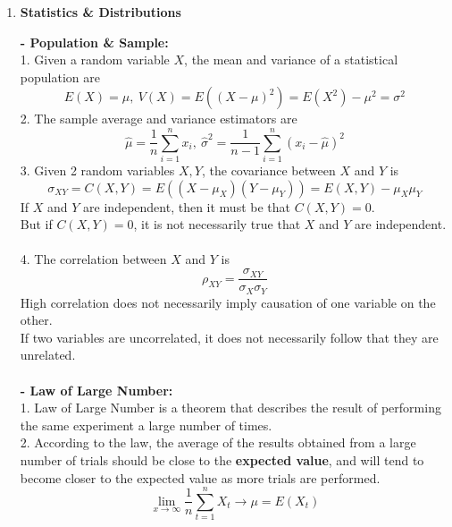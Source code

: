\documentclass{article}
\begin{document}
\begin{enumerate}[S1 - ]
    \item \textbf{Statistics \& Distributions} \\\par
    \textbf{- Population \& Sample:}\\
    1. Given a random variable $X$, the mean and variance of a statistical population are
    \begin{equation*}
    E(X) = \mu, \ V(X) = E((X-\mu)^{2}) = E(X^2)-\mu^2= \sigma^{2}
    \end{equation*}
    2. The sample average and variance estimators are
    \begin{equation*}
    \hat{\mu} = \frac{1}{n} \sum_{i=1}^{n} x_i, \ \hat{\sigma}^2 = \frac{1}{n-1} \sum_{i=1}^{n} (x_i-\hat{\mu})^2
    \end{equation*}
    3. Given 2 random variables $X,Y$, the covariance between $X$ and $Y$ is
    \begin{equation*}
    \sigma_{XY} = C(X,Y) = E((X-\mu_X)(Y-\mu_Y)) = E(X,Y) - \mu_X\mu_Y
    \end{equation*}
    If $X$ and $Y$ are independent, then it must be that $C(X,Y) = 0$.\\
    But if $C(X,Y) = 0$, it is not necessarily true that $X$ and $Y$ are independent.\\
    \\
    4. The correlation between $X$ and $Y$ is
    \begin{equation*}
    \rho_{XY} = \frac{\sigma_{XY}}{\sigma_{X}\sigma_{Y}}
    \end{equation*}
    High correlation does not necessarily imply causation of one variable on the other.\\
    If two variables are uncorrelated, it does not necessarily follow that they are unrelated.\\
    \\
    \textbf{- Law of Large Number:}\\
    1. Law of Large Number is a theorem that describes the result of performing the same experiment a large number of times.\\
    2. According to the law, the average of the results obtained from a large number of trials should be close to the \textbf{expected value}, and will tend to become closer to the expected value as more trials are performed.
    \begin{equation*}
    \lim_{x \to \infty} \frac{1}{n} \sum_{t=1}^{n} X_{t} \rightarrow \mu = E(X_{t})
    \end{equation*}
    \\

\end{enumerate}
\end{document}

